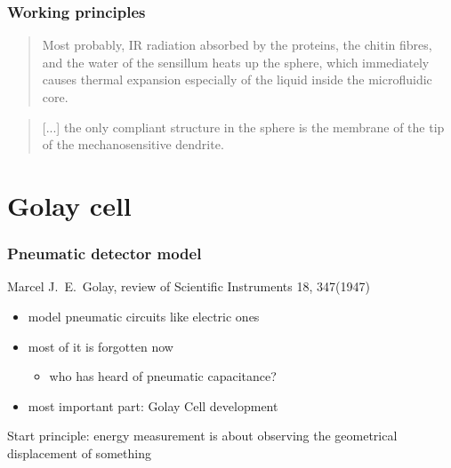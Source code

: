 \documentclass[14pt]{beamer}
\begin{document}
\begin{frame}
\frametitle{Working principles}
\begin{quote}
Most probably, IR radiation absorbed by the proteins, the chitin fibres, and the water of the sensillum heats up the sphere, which immediately causes \alert{thermal expansion} especially of the liquid inside the microfluidic core.
\end{quote}
\begin{quote}
[...] the only \alert{compliant structure} in the sphere is the \alert{membrane} of the tip of the \alert{mechanosensitive dendrite.}
\end{quote}
\end{frame}

\section{Golay cell}

\begin{frame}
\frametitle{Pneumatic detector model}
Marcel J.~E.~Golay, review of Scientific Instruments 18, 347(\alert{1947})
\begin{itemize}
\item model pneumatic circuits like electric ones
\item most of it is forgotten now
\begin{itemize}
\item who has heard of pneumatic capacitance?
\end{itemize}
\item most important part: Golay Cell development
\end{itemize}
Start principle: energy measurement is about observing the geometrical displacement of something
\end{frame}
\end{document}
